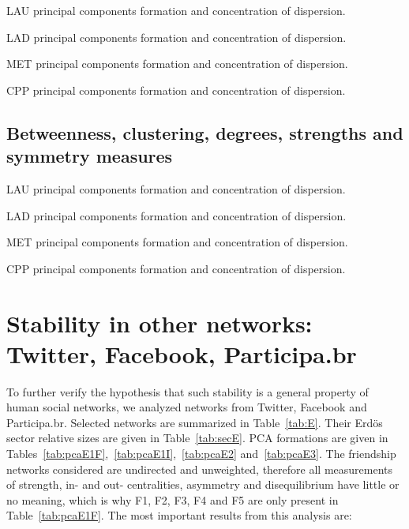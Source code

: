 \documentclass[%
 aip,
 jmp,%
 amsmath,amssymb,
 reprint,%
 floatfix,
]{revtex4-1}
\begin{document}
\begin{table}[!h]
	\caption{LAU principal components formation and concentration of dispersion.}
	\footnotesize
	
\label{tab:pcain}
\end{table}
\begin{table}[!h]
	\caption{LAD principal components formation and concentration of dispersion.}
	\footnotesize
	
\label{tab:pcain}
\end{table}
\begin{table}[!h]
	\caption{MET principal components formation and concentration of dispersion.}
	\footnotesize
	
\label{tab:pcain}
\end{table}
\begin{table}[!h]
	\caption{CPP principal components formation and concentration of dispersion.}
	\footnotesize
	
\label{tab:pcain}
\end{table}


\FloatBarrier
\subsection{Betweenness, clustering, degrees, strengths and symmetry measures}

\begin{table}[!h]
	\caption{LAU principal components formation and concentration of dispersion.}
	\footnotesize
	
\label{tab:pcain}
\end{table}
\begin{table}[!h]
	\caption{LAD principal components formation and concentration of dispersion.}
	\footnotesize
	
\label{tab:pcain}
\end{table}
\begin{table}[!h]
	\caption{MET principal components formation and concentration of dispersion.}
	\footnotesize
	
\label{tab:pcain}
\end{table}
\begin{table}[!h]
	\caption{CPP principal components formation and concentration of dispersion.}
	\footnotesize
	
\label{tab:pcain}
\end{table}

\section{Stability in other networks: Twitter, Facebook, Participa.br}\label{si:ext}
To further verify the hypothesis that such stability is a general property of human social networks,
we analyzed networks from Twitter, Facebook and Participa.br. Selected networks are summarized in
Table~\ref{tab:E}. Their Erd\"os sector relative sizes are given in Table~\ref{tab:secE}. PCA formations are given in
Tables~\ref{tab:pcaE1F},~\ref{tab:pcaE1I},~\ref{tab:pcaE2} and~\ref{tab:pcaE3}. The friendship networks considered are undirected and unweighted, therefore all measurements of strength, in- and out- centralities, asymmetry and disequilibrium have little or no meaning, which is why F1, F2, F3, F4 and F5 are only present in Table~\ref{tab:pcaE1F}.
The most important results from this analysis are:
\end{document}
